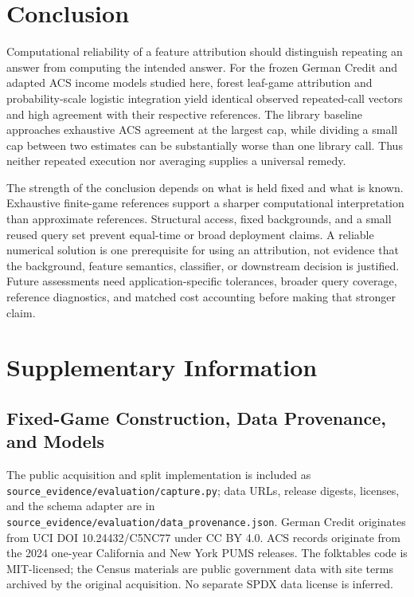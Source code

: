 \documentclass{article}
\begin{document}
\section{Conclusion}
Computational reliability of a feature attribution should distinguish repeating an answer from computing the intended answer. For the frozen German Credit and adapted ACS income models studied here, forest leaf-game attribution and probability-scale logistic integration yield identical observed repeated-call vectors and high agreement with their respective references. The library baseline approaches exhaustive ACS agreement at the largest cap, while dividing a small cap between two estimates can be substantially worse than one library call. Thus neither repeated execution nor averaging supplies a universal remedy.

The strength of the conclusion depends on what is held fixed and what is known. Exhaustive finite-game references support a sharper computational interpretation than approximate references. Structural access, fixed backgrounds, and a small reused query set prevent equal-time or broad deployment claims. A reliable numerical solution is one prerequisite for using an attribution, not evidence that the background, feature semantics, classifier, or downstream decision is justified. Future assessments need application-specific tolerances, broader query coverage, reference diagnostics, and matched cost accounting before making that stronger claim.

\clearpage


\clearpage
\appendix
\section{Supplementary Information}

\subsection{Fixed-Game Construction, Data Provenance, and Models}
The public acquisition and split implementation is included as
\texttt{source\_evidence/evaluation/capture.py}; data URLs, release digests, licenses, and the schema adapter are in \texttt{source\_evidence/evaluation/data\_provenance.json}. German Credit originates from UCI DOI 10.24432/C5NC77 under CC BY 4.0. ACS records originate from the 2024 one-year California and New York PUMS releases. The folktables code is MIT-licensed; the Census materials are public government data with site terms archived by the original acquisition. No separate SPDX data license is inferred.
\end{document}
